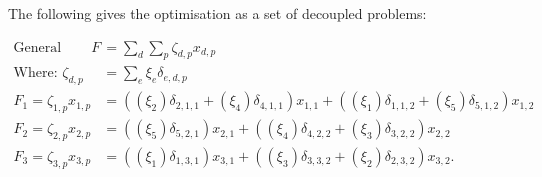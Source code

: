 The following gives the optimisation as a set of decoupled problems:

\begin{align*}
	\text{General Form: } F &= \sum_{d}\sum_{p}\zeta_{d,p}x_{d,p}\\
	\text{Where: } \zeta_{d,p} &= \sum_e\xi_{e}\delta_{e,d,p} \\
	F_1 = \zeta_{1,p}x_{1,p} &=
	((\xi_{2})\delta_{2,1,1}+(\xi_{4})\delta_{4,1,1})x_{1,1} + ((\xi_1)\delta_{1,1,2}+(\xi_5)\delta_{5,1,2})x_{1,2}  \\
	F_2 = \zeta_{2,p}x_{2,p} &= ((\xi_5)\delta_{5,2,1})x_{2,1}+((\xi_4)\delta_{4,2,2}+(\xi_3)\delta_{3,2,2})x_{2,2} \\
	F_3 = \zeta_{3,p}x_{3,p} &= ((\xi_1)\delta_{1,3,1})x_{3,1}+((\xi_3)\delta_{3,3,2}+(\xi_2)\delta_{2,3,2})x_{3,2}
.\end{align*}



